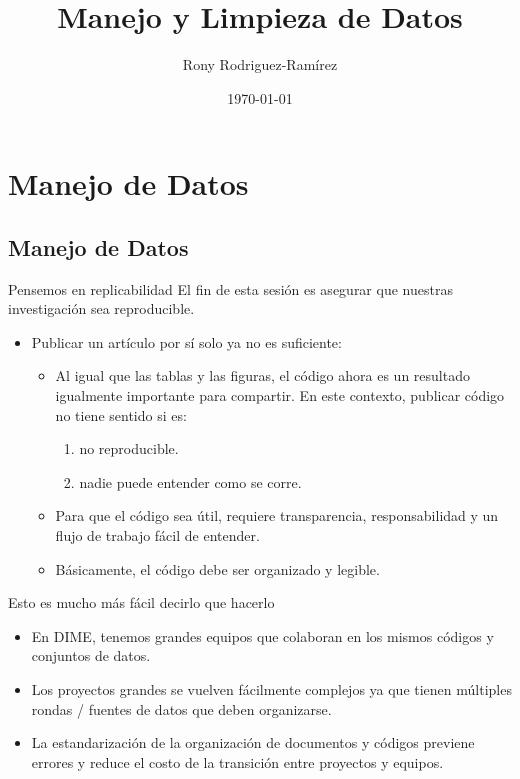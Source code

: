 \documentclass[11pt, aspectratio=169, compress]{beamer}
\title{Manejo y Limpieza de Datos}
\author{Rony Rodriguez-Ramírez}
\institute{LAMBDA}
\date{\today}
\begin{document}
\begin{frame}[plain]
	\maketitle 
\end{frame}
\section{Manejo de Datos}
\subsection{Manejo de Datos}
\begin{frame}{Pensemos en replicabilidad}
	El fin de esta sesión es asegurar que nuestras investigación sea reproducible. 
	\begin{itemize}
		\item Publicar un artículo por sí solo ya no es suficiente:
		\begin{itemize}
			\item Al igual que las tablas y las figuras, el código ahora es un resultado igualmente importante para compartir. En este contexto, publicar código no tiene sentido si es:
			\begin{enumerate}
				\item no reproducible. 
				\item nadie puede entender como se corre.
			\end{enumerate}
			\item Para que el código sea útil, requiere transparencia, responsabilidad y un flujo de trabajo fácil de entender.
			\item Básicamente, el código debe ser organizado y legible. 
		\end{itemize}
	\end{itemize}
\end{frame}
\begin{frame}{Esto es mucho más fácil decirlo que hacerlo}
	\begin{itemize}
		\item En DIME, tenemos grandes equipos que colaboran en los mismos códigos y conjuntos de datos. 
		\item Los proyectos grandes se vuelven fácilmente complejos ya que tienen múltiples rondas / fuentes de datos que deben organizarse.
		\item La estandarización de la organización de documentos y códigos previene errores y reduce el costo de la transición entre proyectos y equipos.
	\end{itemize}
\end{frame}
\end{document}
